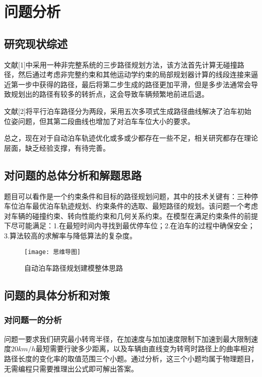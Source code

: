 \documentclass{MathorCupmodeling}
\begin{document}
	
	\section{问题分析}
	\subsection{研究现状综述}
	文献[1]中采用一种非完整系统的三步路径规划方法，该方法首先计算无碰撞路径，然后通过考虑非完整约束和其他运动学约束的局部规划器计算的线段连接来逼近第一步中获得的路径，最后将第二步生成的路径更加平滑，但是多步法通常会导致规划出的路径有较多的转折点，这会导致车辆频繁地前进后退。

	文献[2]将平行泊车路径分为两段，采用五次多项式生成路径曲线解决了泊车初始位姿问题，但其第二段曲线也增加了对泊车车位大小的要求。

	总之，现在对于自动泊车轨迹优化或多或少都存在一些不足，相关研究都存在理论层面，缺乏经验支撑，有待完善。

	

	\subsection{对问题的总体分析和解题思路}

	题目可以看作是一个约束条件和目标的路径规划问题，其中的技术关键有：三种停车位泊车最优泊车轨迹规划、约束条件的选取、最短路径的规划。该问题一个考虑对车辆的碰撞约束、转向性能约束和几何关系约束。在模型在满足约束条件的前提下尽可能满足：1.在最短时间内寻找到最优停车位；2.在泊车的过程中确保安全；3.算法较高的求解率与降低算法的复杂度。
	
	\begin{figure}[h]
		\centering
		\texttt{[image: 思维导图]}
		\caption{自动泊车路径规划建模整体思路}
		\label{fig:circuit-diagram}
	\end{figure}

	\subsection{问题的具体分析和对策}

	\subsubsection{对问题一的分析}

	问题一要求我们研究最小转弯半径，在加速度与加加速度限制下加速到最大限制速度$20km/h$最短需要行驶多少距离，以及车辆由直线变为转弯时路径上的曲率相对路径长度的变化率的取值范围三个小题。通过分析，这三个小题均属于物理题目，无需编程只需要推理出公式即可解出答案。
\end{document}
